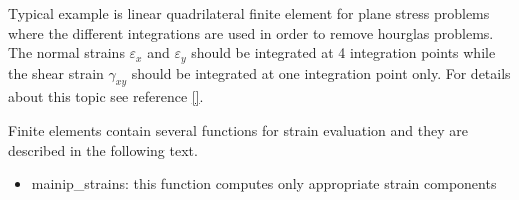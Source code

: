 Typical example is linear quadrilateral finite element for plane stress problems
where the different integrations are used in order to remove hourglas problems.
The normal strains $\varepsilon_x$ and $\varepsilon_y$ should be integrated
at 4 integration points while the shear strain $\gamma_{xy}$ should be integrated
at one integration point only. For details about this topic see reference \ref{}.




Finite elements contain several functions for strain evaluation and they are
described in the following text.

\begin{itemize}
\item
{\sf mainip\_strains}: this function computes only appropriate strain components
\end{itemize}

